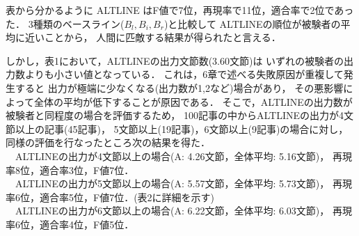 表から分かるように
ALTLINE はF値で7位，再現率で11位，適合率で2位であった．
3種類のベースライン($B_{l}, B_{i}, B_{r}$)と比較して
ALTLINEの順位が被験者の平均に近いことから，
人間に匹敵する結果が得られたと言える．


しかし，表1において，ALTLINEの出力文節数(3.60文節)は
いずれの被験者の出力数よりも小さい値となっている．
これは，6章で述べる失敗原因が重複して発生すると
出力が極端に少なくなる(出力数が1,2など)場合があり，
その悪影響によって全体の平均が低下することが原因である．
そこで，ALTLINEの出力数が被験者と同程度の場合を評価するため，
100記事の中からALTLINEの出力が4文節以上の記事(45記事)，
5文節以上(19記事)，6文節以上(9記事)の場合に対し，
同様の評価を行なったところ次の結果を得た．\\
　ALTLINEの出力が4文節以上の場合(A: 4.26文節，全体平均: 5.16文節)，
再現率8位，適合率3位，F値7位．\\
　ALTLINEの出力が5文節以上の場合(A: 5.57文節，全体平均: 5.73文節)，
再現率6位，適合率5位，F値7位．(表2に詳細を示す)\\
　ALTLINEの出力が6文節以上の場合(A: 6.22文節，全体平均: 6.03文節)，
再現率6位，適合率4位，F値5位．

